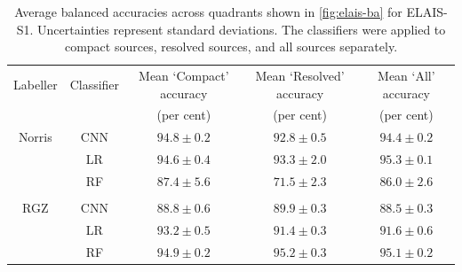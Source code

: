\documentclass[fleqn,usenatbib,usedcolumn]{mnras}
\begin{document}
\begin{table}
  \caption{Average balanced accuracies across quadrants shown in
    \autoref{fig:elais-ba} for ELAIS-S1. Uncertainties represent standard
    deviations. The classifiers were applied to compact sources, resolved
    sources, and all sources separately.}
  \label{tab:average-accuracies-elais}
  \begin{tabular}{ccccc}
    \hline
    Labeller & Classifier & Mean `Compact' accuracy & Mean `Resolved' accuracy & Mean `All' accuracy \\
     & & (per cent) & (per cent) & (per cent)\\
    \hline
    Norris & CNN & $94.8 \pm 0.2$ & $92.8 \pm 0.5$ & $94.4 \pm 0.2$ \\
     & LR & $94.6 \pm 0.4$ & $93.3 \pm 2.0$ & $95.3 \pm 0.1$ \\
     & RF & $87.4 \pm 5.6$ & $71.5 \pm 2.3$ & $86.0 \pm 2.6$ \\
     \\
    RGZ & CNN & $88.8 \pm 0.6$ & $89.9 \pm 0.3$ & $88.5 \pm 0.3$ \\
     & LR & $93.2 \pm 0.5$ & $91.4 \pm 0.3$ & $91.6 \pm 0.6$ \\
     & RF & $94.9 \pm 0.2$ & $95.2 \pm 0.3$ & $95.1 \pm 0.2$ \\
     \hline
  \end{tabular}
\end{table}
\end{document}
